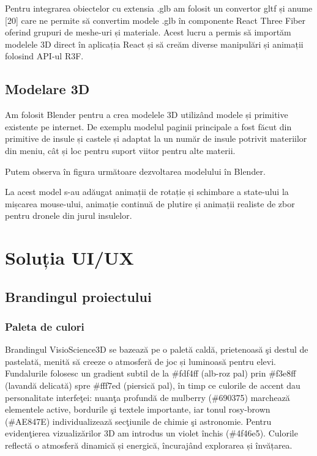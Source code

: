 Pentru integrarea obiectelor cu extensia .glb am folosit un convertor gltf  și anume [20] care
ne permite să convertim modele .glb în componente React Three Fiber oferind grupuri de meshe-uri și
materiale. Acest lucru a permis să importăm modelele 3D direct în aplicația React și să creăm
diverse manipulări și animații folosind API-ul R3F.




\subsection{Modelare 3D}
Am folosit Blender pentru a crea modelele 3D utilizând modele și primitive existente pe internet. De exemplu
modelul paginii principale a fost făcut din primitive de insule și castele și adaptat la un număr de 
insule potrivit materiilor din meniu, cât și loc pentru suport viitor pentru alte materii. 

Putem observa în figura următoare dezvoltarea modelului în Blender.


La acest model s-au adăugat animații de rotație și schimbare a state-ului la mișcarea mouse-ului,
animație continuă de plutire și animații realiste de zbor pentru dronele din jurul insulelor.


\section{Soluția UI/UX}
\label{sub-sec:proj-ui-ux}
\subsection{Brandingul proiectului}
\subsubsection{Paleta de culori}
Brandingul VisioScience3D se bazează pe o paletă caldă, prietenoasă şi destul de pastelată,
menită să creeze o atmosferă de joc și luminoasă pentru elevi. Fundalurile folosesc un gradient
subtil de la \#fdf4ff (alb-roz pal) prin \#f3e8ff (lavandă delicată) spre \#fff7ed (piersică pal),
în timp ce culorile de accent dau personalitate interfeţei: nuanţa profundă de mulberry (\#690375)
marchează elementele active, bordurile şi textele importante, iar tonul rosy-brown (\#AE847E) 
individualizează secţiunile de chimie şi astronomie. Pentru evidenţierea vizualizărilor 3D
am introdus un violet închis (\#4f46e5). Culorile reflectă o atmosferă dinamică și 
energică, încurajând explorarea și învățarea.

